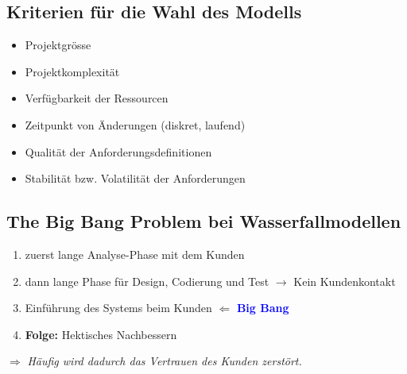 \begin{multicols}{2}
\subsection{Kriterien für die Wahl des Modells}
\begin{itemize}
	\item Projektgrösse
	\item Projektkomplexität
	\item Verfügbarkeit der Ressourcen
	\item Zeitpunkt von Änderungen (diskret, laufend)
	\item Qualität der Anforderungsdefinitionen
	\item Stabilität bzw. Volatilität der Anforderungen
\end{itemize}

\subsection{The Big Bang Problem bei Wasserfallmodellen}
\begin{enumerate}
	\item zuerst lange Analyse-Phase mit dem Kunden
	\item dann lange Phase für Design, Codierung und Test \newline $\rightarrow$ Kein Kundenkontakt
	\item Einführung des Systems beim Kunden $\Leftarrow$ \textcolor{blue}{\textbf{Big Bang}} 
	\item \textbf{Folge:} Hektisches Nachbessern
\end{enumerate}
$\Rightarrow$ \textit{Häufig wird dadurch das Vertrauen des Kunden zerstört.}
\end{multicols}
\clearpage